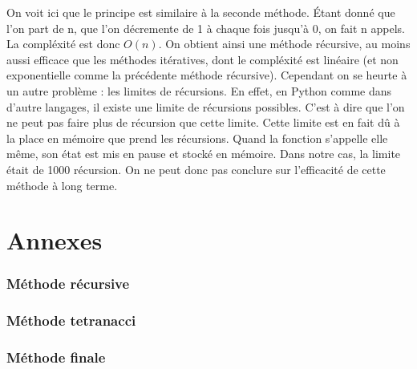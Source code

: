\documentclass{article}
\newcommand{\code}[1]{}
\begin{document}
On voit ici que le principe est similaire à la seconde méthode. \'Etant donné que l'on part de n, que l'on décremente de 1 à chaque fois jusqu'à 0, on fait n appels. La compléxité est donc $O(n)$. On obtient ainsi une méthode récursive, au moins aussi efficace que les méthodes itératives, dont le compléxité est linéaire (et non exponentielle comme la précédente méthode récursive). Cependant on se heurte à un autre problème : les limites de récursions. En effet, en Python comme dans d'autre langages, il existe une limite de récursions possibles. C'est à dire que l'on ne peut pas faire plus de récursion que cette limite. Cette limite est en fait dû à la place en mémoire que prend les récursions. Quand la fonction s'appelle elle même, son état est mis en pause et stocké en mémoire. Dans notre cas, la limite était de 1000 récursion. On ne peut donc pas conclure sur l'efficacité de cette méthode à long terme.

\newpage
\part{Annexes}
\section*{Méthode récursive}
\code{Algos/Problem117_1_rapport.py}


\section*{Méthode tetranacci}
\code{Algos/Problem117_2_rapport.py}

\newpage
\section*{Méthode finale}
\code{Algos/Problem117_3_rapport.py}
\end{document}

